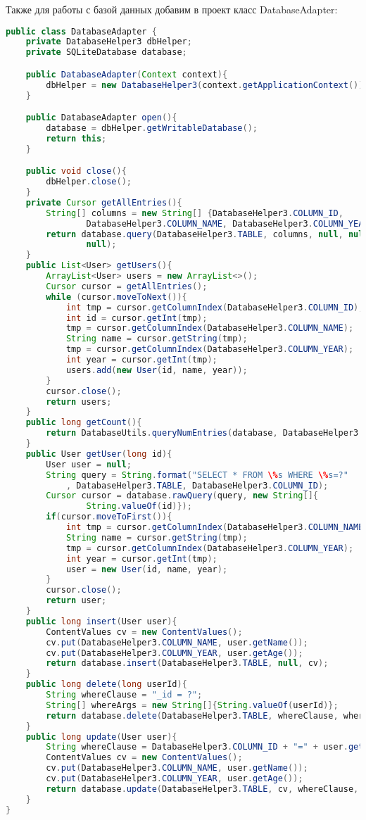 Также для работы с базой данных добавим в проект класс DatabaseAdapter:

\begin{lstlisting}[language=Java
	, label=lst:
	]
public class DatabaseAdapter {
	private DatabaseHelper3 dbHelper;
	private SQLiteDatabase database;

	public DatabaseAdapter(Context context){
		dbHelper = new DatabaseHelper3(context.getApplicationContext());
	}

	public DatabaseAdapter open(){
		database = dbHelper.getWritableDatabase();
		return this;
	}

	public void close(){
		dbHelper.close();
	}
	private Cursor getAllEntries(){
		String[] columns = new String[] {DatabaseHelper3.COLUMN_ID,
				DatabaseHelper3.COLUMN_NAME, DatabaseHelper3.COLUMN_YEAR};
		return database.query(DatabaseHelper3.TABLE, columns, null, null, null, null,
				null);
	}
	public List<User> getUsers(){
		ArrayList<User> users = new ArrayList<>();
		Cursor cursor = getAllEntries();
		while (cursor.moveToNext()){
			int tmp = cursor.getColumnIndex(DatabaseHelper3.COLUMN_ID);
			int id = cursor.getInt(tmp);
			tmp = cursor.getColumnIndex(DatabaseHelper3.COLUMN_NAME);
			String name = cursor.getString(tmp);
			tmp = cursor.getColumnIndex(DatabaseHelper3.COLUMN_YEAR);
			int year = cursor.getInt(tmp);
			users.add(new User(id, name, year));
		}
		cursor.close();
		return users;
	}
	public long getCount(){
		return DatabaseUtils.queryNumEntries(database, DatabaseHelper3.TABLE);
	}
	public User getUser(long id){
		User user = null;
		String query = String.format("SELECT * FROM \%s WHERE \%s=?"
			, DatabaseHelper3.TABLE, DatabaseHelper3.COLUMN_ID);
		Cursor cursor = database.rawQuery(query, new String[]{
				String.valueOf(id)});
		if(cursor.moveToFirst()){
			int tmp = cursor.getColumnIndex(DatabaseHelper3.COLUMN_NAME);
			String name = cursor.getString(tmp);
			tmp = cursor.getColumnIndex(DatabaseHelper3.COLUMN_YEAR);
			int year = cursor.getInt(tmp);
			user = new User(id, name, year);
		}
		cursor.close();
		return user;
	}
	public long insert(User user){
		ContentValues cv = new ContentValues();
		cv.put(DatabaseHelper3.COLUMN_NAME, user.getName());
		cv.put(DatabaseHelper3.COLUMN_YEAR, user.getAge());
		return database.insert(DatabaseHelper3.TABLE, null, cv);
	}
	public long delete(long userId){
		String whereClause = "_id = ?";
		String[] whereArgs = new String[]{String.valueOf(userId)};
		return database.delete(DatabaseHelper3.TABLE, whereClause, whereArgs);
	}
	public long update(User user){
		String whereClause = DatabaseHelper3.COLUMN_ID + "=" + user.getId();
		ContentValues cv = new ContentValues();
		cv.put(DatabaseHelper3.COLUMN_NAME, user.getName());
		cv.put(DatabaseHelper3.COLUMN_YEAR, user.getAge());
		return database.update(DatabaseHelper3.TABLE, cv, whereClause, null);
	}
}
\end{lstlisting}

